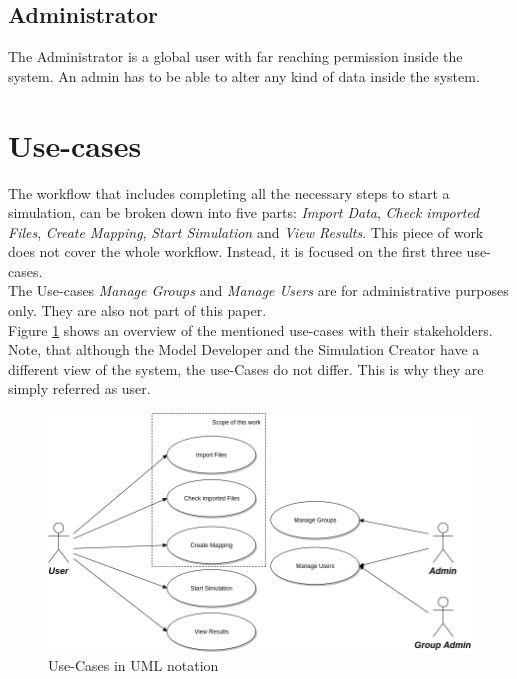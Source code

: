 \subsection{Administrator}
The Administrator is a global user with far reaching permission inside the system. An admin has to be able to alter any kind of data inside the system.


\section{Use-cases}
The workflow that includes completing all the necessary steps to start a simulation, can be broken down into five parts: \textit{Import Data}, \textit{Check imported Files}, \textit{Create Mapping}, \textit{Start Simulation} and \textit{View Results}. This piece of work does not cover the whole workflow. Instead, it is focused on the first three use-cases.\\
The Use-cases \textit{Manage Groups} and \textit{Manage Users} are for administrative purposes only. They are also not part of this paper.\\
Figure \ref{fig:use-cases} shows an overview of the mentioned use-cases with their stakeholders. Note, that although the Model Developer and the Simulation Creator have a different view of the system, the use-Cases do not differ. This is why they are simply referred as user.
\begin{figure}[H]
	\centering\includegraphics[width=1\textwidth]{res/Use-Cases_reduced}
	\caption{Use-Cases in UML notation}
	\label{fig:use-cases}
\end{figure}

